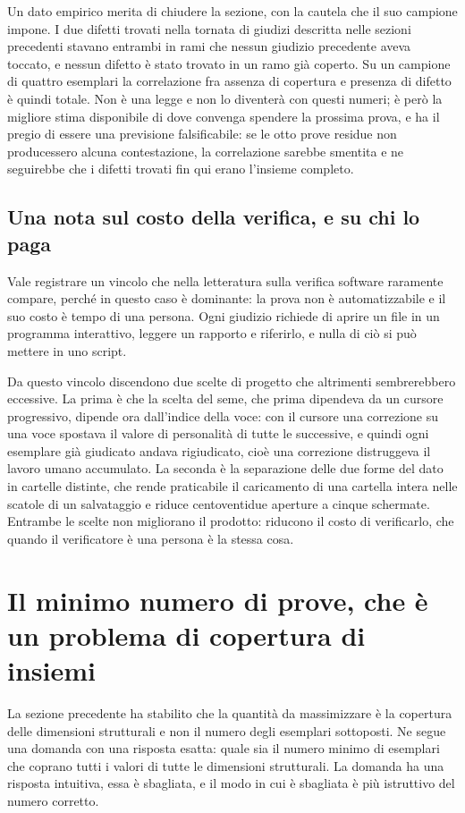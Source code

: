 Un dato empirico merita di chiudere la sezione, con la cautela che il suo campione impone. I due difetti trovati nella tornata di giudizi descritta nelle sezioni precedenti stavano entrambi in rami che nessun giudizio precedente aveva toccato, e nessun difetto è stato trovato in un ramo già coperto. Su un campione di quattro esemplari la correlazione fra assenza di copertura e presenza di difetto è quindi totale. Non è una legge e non lo diventerà con questi numeri; è però la migliore stima disponibile di dove convenga spendere la prossima prova, e ha il pregio di essere una previsione falsificabile: se le otto prove residue non producessero alcuna contestazione, la correlazione sarebbe smentita e ne seguirebbe che i difetti trovati fin qui erano l'insieme completo.

\subsection*{Una nota sul costo della verifica, e su chi lo paga}

Vale registrare un vincolo che nella letteratura sulla verifica software raramente compare, perché in questo caso è dominante: la prova non è automatizzabile e il suo costo è tempo di una persona. Ogni giudizio richiede di aprire un file in un programma interattivo, leggere un rapporto e riferirlo, e nulla di ciò si può mettere in uno script.

Da questo vincolo discendono due scelte di progetto che altrimenti sembrerebbero eccessive. La prima è che la scelta del seme, che prima dipendeva da un cursore progressivo, dipende ora dall'indice della voce: con il cursore una correzione su una voce spostava il valore di personalità di tutte le successive, e quindi ogni esemplare già giudicato andava rigiudicato, cioè una correzione distruggeva il lavoro umano accumulato. La seconda è la separazione delle due forme del dato in cartelle distinte, che rende praticabile il caricamento di una cartella intera nelle scatole di un salvataggio e riduce centoventidue aperture a cinque schermate. Entrambe le scelte non migliorano il prodotto: riducono il costo di verificarlo, che quando il verificatore è una persona è la stessa cosa.
\section{Il minimo numero di prove, che è un problema di copertura di insiemi}

La sezione precedente ha stabilito che la quantità da massimizzare è la copertura delle dimensioni strutturali e non il numero degli esemplari sottoposti. Ne segue una domanda con una risposta esatta: quale sia il numero minimo di esemplari che coprano tutti i valori di tutte le dimensioni strutturali. La domanda ha una risposta intuitiva, essa è sbagliata, e il modo in cui è sbagliata è più istruttivo del numero corretto.

